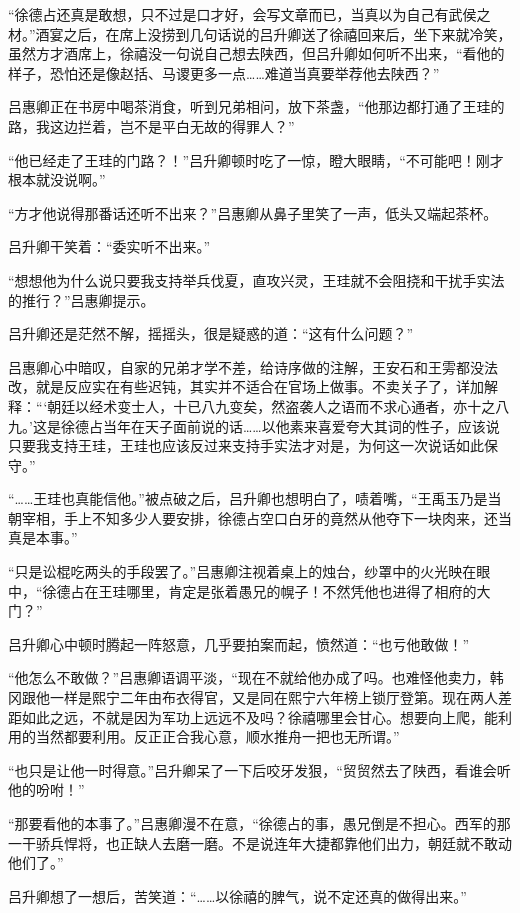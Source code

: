 “徐德占还真是敢想，只不过是口才好，会写文章而已，当真以为自己有武侯之材。”酒宴之后，在席上没捞到几句话说的吕升卿送了徐禧回来后，坐下来就冷笑，虽然方才酒席上，徐禧没一句说自己想去陕西，但吕升卿如何听不出来，“看他的样子，恐怕还是像赵括、马谡更多一点……难道当真要举荐他去陕西？”

吕惠卿正在书房中喝茶消食，听到兄弟相问，放下茶盏，“他那边都打通了王珪的路，我这边拦着，岂不是平白无故的得罪人？”

“他已经走了王珪的门路？！”吕升卿顿时吃了一惊，瞪大眼睛，“不可能吧！刚才根本就没说啊。”

“方才他说得那番话还听不出来？”吕惠卿从鼻子里笑了一声，低头又端起茶杯。

吕升卿干笑着：“委实听不出来。”

“想想他为什么说只要我支持举兵伐夏，直攻兴灵，王珪就不会阻挠和干扰手实法的推行？”吕惠卿提示。

吕升卿还是茫然不解，摇摇头，很是疑惑的道：“这有什么问题？”

吕惠卿心中暗叹，自家的兄弟才学不差，给诗序做的注解，王安石和王雱都没法改，就是反应实在有些迟钝，其实并不适合在官场上做事。不卖关子了，详加解释：“‘朝廷以经术变士人，十已八九变矣，然盗袭人之语而不求心通者，亦十之八九。’这是徐德占当年在天子面前说的话……以他素来喜爱夸大其词的性子，应该说只要我支持王珪，王珪也应该反过来支持手实法才对是，为何这一次说话如此保守。”

“……王珪也真能信他。”被点破之后，吕升卿也想明白了，啧着嘴，“王禹玉乃是当朝宰相，手上不知多少人要安排，徐德占空口白牙的竟然从他夺下一块肉来，还当真是本事。”

“只是讼棍吃两头的手段罢了。”吕惠卿注视着桌上的烛台，纱罩中的火光映在眼中，“徐德占在王珪哪里，肯定是张着愚兄的幌子！不然凭他也进得了相府的大门？”

吕升卿心中顿时腾起一阵怒意，几乎要拍案而起，愤然道：“也亏他敢做！”

“他怎么不敢做？”吕惠卿语调平淡，“现在不就给他办成了吗。也难怪他卖力，韩冈跟他一样是熙宁二年由布衣得官，又是同在熙宁六年榜上锁厅登第。现在两人差距如此之远，不就是因为军功上远远不及吗？徐禧哪里会甘心。想要向上爬，能利用的当然都要利用。反正正合我心意，顺水推舟一把也无所谓。”

“也只是让他一时得意。”吕升卿呆了一下后咬牙发狠，“贸贸然去了陕西，看谁会听他的吩咐！”

“那要看他的本事了。”吕惠卿漫不在意，“徐德占的事，愚兄倒是不担心。西军的那一干骄兵悍将，也正缺人去磨一磨。不是说连年大捷都靠他们出力，朝廷就不敢动他们了。”

吕升卿想了一想后，苦笑道：“……以徐禧的脾气，说不定还真的做得出来。”


